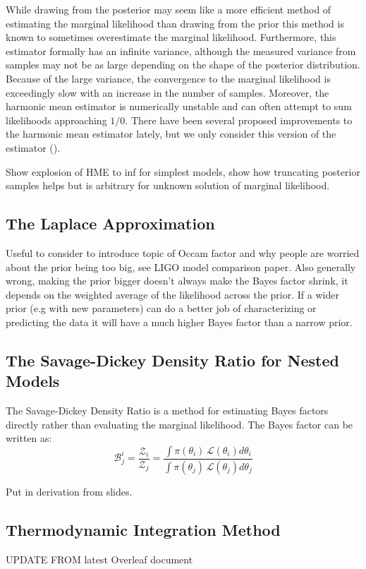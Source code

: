 While drawing from the posterior may seem like a more efficient method of estimating the marginal likelihood than drawing from the prior this method is known to sometimes  overestimate the marginal likelihood. Furthermore, this estimator formally has an infinite variance, although the measured variance from samples may not be as large depending on the shape of the posterior distribution. Because of the large variance, the convergence to the marginal likelihood is exceedingly slow with an increase in the number of samples. Moreover, the harmonic mean estimator is numerically unstable and can often attempt to sum likelihoods approaching $1/0$. There have been several proposed improvements to the harmonic mean estimator lately, but we only consider this version of the estimator ().

Show explosion of HME to inf for simplest models, show how truncating posterior samples helps but is arbitrary for
unknown solution of marginal likelihood.

\subsection{The Laplace Approximation}
Useful to consider to introduce topic of Occam factor and why people are worried about the prior being too big, see LIGO model comparison
paper. Also generally wrong, making the prior bigger doesn't always make the Bayes factor shrink, it depends on the weighted average
of the likelihood across the prior. If a wider prior (e.g with new parameters) can do a better job of characterizing or predicting
the data it will have a much higher Bayes factor than a narrow prior.

\subsection{The Savage-Dickey Density Ratio for Nested Models}
The Savage-Dickey Density Ratio is a method for estimating Bayes factors directly rather than evaluating the marginal likelihood. The Bayes factor can be written as:
\begin{equation}
    \mathcal{B}^i_j = \frac{\mathcal{Z}_i}{\mathcal{Z}_j} = \frac{\int \pi \left(\theta_i \right) \, \mathcal{L}\left(\theta_i\right) d\theta_i}{\int \pi \left(\theta_j \right) \, \mathcal{L}\left(\theta_j\right) d\theta_j}
\end{equation}

Put in derivation from slides.

\subsection{Thermodynamic Integration Method}
UPDATE FROM latest Overleaf document

